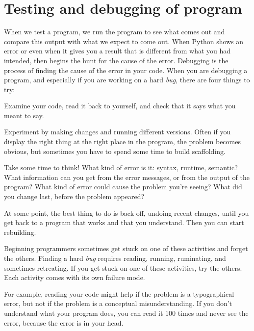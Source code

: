 \hypertarget{depurando-los-programas}{%
\section{Testing and debugging of program}\label{depurando-los-programas}}

When we test a program, we run the program to see what comes out and compare this output with what we expect to come out.
%
When Python shows an error or even when it gives you a result that is different from what you had intended, then begins the hunt for the cause of the error. Debugging is the process of finding the cause of the error in your code. When you are debugging a program, and especially if you are working on a hard \emph{bug}, there are four things to try:

\begin{description}
\tightlist
\item[reading]
Examine your code, read it back to yourself, and check that it says what you meant to say.
\item[running]
Experiment by making changes and running different versions. Often if you display the right thing at the right place in the program, the problem becomes obvious, but sometimes you have to spend some time to build scaffolding.
\item[ruminating]
Take some time to think! What kind of error is it: syntax, runtime, semantic? What information can you get from the error messages, or from the output of the program? What kind of error could cause the problem you're seeing? What did you change last, before the problem appeared?
\item[retreating]
At some point, the best thing to do is back off, undoing recent changes, until you get back to a program that works and that you understand. Then you can start rebuilding.
\end{description}

Beginning programmers sometimes get stuck on one of these activities and forget the others. Finding a hard \emph{bug} requires reading, running, ruminating, and sometimes retreating. If you get stuck on one of these activities, try the others. Each activity comes with its own failure mode.


For example, reading your code might help if the problem is a typographical error, but not if the problem is a conceptual misunderstanding. If you don't understand what your program does, you can read it 100 times and never see the error, because the error is in your head.

